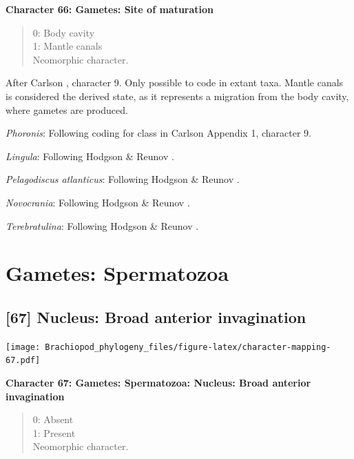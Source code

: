 \documentclass[]{book}
\theoremstyle{definition}
\theoremstyle{definition}
\theoremstyle{definition}
\theoremstyle{remark}
\begin{document}
\textbf{Character 66: Gametes: Site of maturation}

\begin{quote}
0: Body cavity\\
1: Mantle canals\\
Neomorphic character.
\end{quote}

After Carlson \citeyearpar{Carlson1995Phylogeneticrelationships},
character 9. Only possible to code in extant taxa. Mantle canals is
considered the derived state, as it represents a migration from the body
cavity, where gametes are produced.

\emph{Phoronis}: Following coding for class in Carlson
\citeyearpar{Carlson1995Phylogeneticrelationships} Appendix 1, character
9.

\emph{Lingula}: Following Hodgson \& Reunov
\citeyearpar{Hodgson1994Ultrastructureof}.

\emph{Pelagodiscus atlanticus}: Following Hodgson \& Reunov
\citeyearpar{Hodgson1994Ultrastructureof}.

\emph{Novocrania}: Following Hodgson \& Reunov
\citeyearpar{Hodgson1994Ultrastructureof}.

\emph{Terebratulina}: Following Hodgson \& Reunov
\citeyearpar{Hodgson1994Ultrastructureof}.

\hypertarget{gametes-spermatozoa}{%
\section{Gametes: Spermatozoa}\label{gametes-spermatozoa}}

\hypertarget{nucleus-broad-anterior-invagination}{%
\subsection*{{[}67{]} Nucleus: Broad anterior
invagination}\label{nucleus-broad-anterior-invagination}}

\texttt{[image: Brachiopod\_phylogeny\_files/figure-latex/character-mapping-67.pdf]}

\textbf{Character 67: Gametes: Spermatozoa: Nucleus: Broad anterior
invagination}

\begin{quote}
0: Absent\\
1: Present\\
Neomorphic character.
\end{quote}
\end{document}
